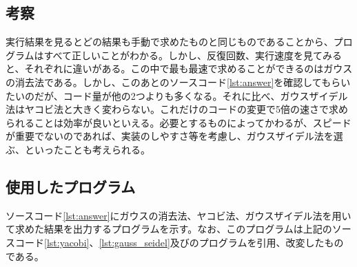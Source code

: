 \documentclass[12pt]{jsarticle}
\begin{document}
\subsection{考察}
実行結果を見るとどの結果も手動で求めたものと同じものであることから、プログラムはすべて正しいことがわかる。しかし、反復回数、実行速度を見てみると、それぞれに違いがある。この中で最も最速で求めることができるのはガウスの消去法である。しかし、このあとのソースコード\ref{lst:answer}を確認してもらいたいのだが、コード量が他の2つよりも多くなる。それに比べ、ガウスザイデル法はヤコビ法と大きく変わらない。これだけのコードの変更で5倍の速さで求められることは効率が良いといえる。必要とするものによってかわるが、スピードが重要でないのであれば、実装のしやすさ等を考慮し、ガウスザイデル法を選ぶ、といったことも考えられる。


\subsection{使用したプログラム}

ソースコード\ref{lst:answer}にガウスの消去法、ヤコビ法、ガウスザイデル法を用いて求めた結果を出力するプログラムを示す。なお、このプログラムは上記のソースコード\ref{lst:yacobi}、\ref{lst:gauss_seidel}及び\cite{gaussian}のプログラムを引用、改変したものである。
\end{document}
